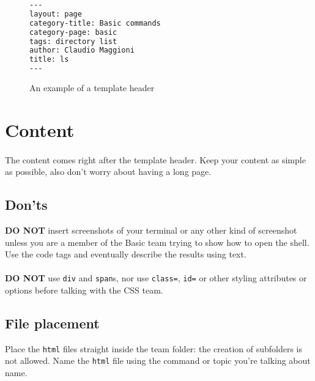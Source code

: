 \documentclass[hidelinks,12pt,a4paper,numbers=enddot]{scrartcl}
\begin{document}
\begin{figure}[h]
\begin{lstlisting}[language=html]
---
layout: page
category-title: Basic commands
category-page: basic
tags: directory list
author: Claudio Maggioni
title: ls
---
\end{lstlisting}
\caption{An example of a template header}
\end{figure}

\section{Content}

\paragraph{}
The content comes right after the template header.
Keep your content as simple as possible, also don't worry about having a long page.

\subsection{Don'ts}
\textbf{DO NOT} insert screenshots of your terminal or any other kind of screenshot
unless you are a member of the Basic team trying to show how to open the shell. Use
the code tags and eventually describe the results using text.

\paragraph{}
\textbf{DO NOT} use \texttt{div} and \texttt{span}s, nor use \texttt{class=}, \texttt{id=}
or other styling attributes or options before talking with the CSS team. 

\subsection{File placement}
Place the \texttt{html} files straight inside the team folder: the creation of subfolders is not
allowed. Name the \texttt{html} file using the command or topic you're talking about name.
\end{document}
